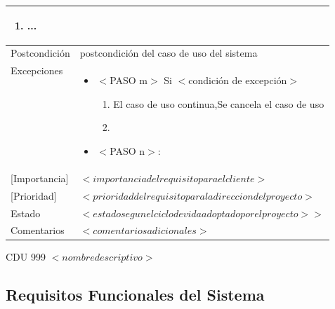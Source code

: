 \begin{Artefacto}[H]
\begin{tabular}{|p{3cm}|p{10cm}|}
\begin{enumerate}
       \item	... \end{enumerate}\\  

\hline          
  \cellcolor{gray30} Postcondición	& postcondición del caso de uso del sistema \\
  \hline
 \cellcolor{gray30}  Excepciones&
 \begin{itemize} 	        
			\item	$<$PASO m$>$	Si $<$condición de excepción$>$
            \begin {enumerate}
            \item 	{El caso de uso continua,Se cancela el caso de uso}
            \item
            \end{enumerate}
            \item	$<$PASO n$>$: 
 \end{itemize}\\ 
\hline
        \hline          
           \cellcolor{gray30}[Importancia]	& $<importancia del requisito para el cliente>$  \\
         \hline
         \cellcolor{gray30}  [Prioridad] &  	$<prioridad del requisito para la direccion del proyecto>$\\
         \hline
         \cellcolor{gray30}  Estado	&$<estado  segun el ciclo de vida adoptado por el proyecto>>$\\   
        \hline       
         \cellcolor{gray30}  Comentarios	& $<comentarios adicionales>$ \\   
        \hline
  
    \end{tabular}
\caption{CDU 999	$<nombre descriptivo>$ }
  \end{Artefacto}











\subsection{Requisitos Funcionales del Sistema}

